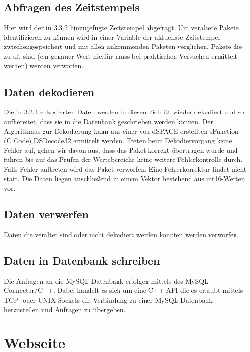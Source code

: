 \documentclass[fontsize = 12pt, paper = a4]{scrreprt}
\begin{document}
\subsection{Abfragen des Zeitstempels}

Hier wird der in 3.3.2 hinzugefügte Zeitstempel abgefragt. Um veraltete Pakete identifizieren zu können wird in einer Variable der aktuellste Zeitstempel zwischengespeichert und mit allen ankommenden Paketen verglichen. Pakete die zu alt sind (ein genauer Wert hierfür muss bei praktischen Versuchen ermittelt werden) werden verworfen. 

\subsection{Daten dekodieren}

Die in 3.2.4 enkodierten Daten werden in diesem Schritt wieder dekodiert und so aufbereitet, dass sie in die Datenbank geschrieben werden können. Der Algorithmus zur Dekodierung kann aus einer von dSPACE erstellten sFunction (C Code) DSDecode32 ermittelt werden. Treten beim Dekodiervorgang keine Fehler auf, gehen wir davon aus, dass das Paket korrekt übertragen wurde und führen bis auf das Prüfen der Wertebereiche keine weitere Fehlerkontrolle durch. Falls Fehler auftreten wird das Paket verworfen. Eine Fehlerkorrektur findet nicht statt. Die Daten liegen anschließend in einem Vektor bestehend aus int16-Werten vor. 

\subsection{Daten verwerfen}

Daten die veraltet sind oder nicht dekodiert werden konnten werden verworfen. 

\subsection{Daten in Datenbank schreiben}

Die Anfragen an die MySQL-Datenbank erfolgen mittels des MySQL Connector/C++. Dabei handelt es sich um eine C++ API die es erlaubt mittels TCP- oder UNIX-Sockets die Verbindung zu einer MySQL-Datenbank herzustellen und Anfragen zu übergeben. 

\newpage

\section{Webseite}
\end{document}
